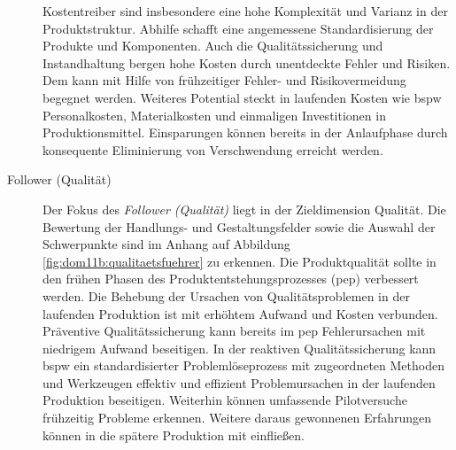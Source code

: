 \begin{description}
Kostentreiber sind insbesondere eine hohe Komplexität und Varianz in der Produktstruktur. Abhilfe schafft eine angemessene Standardisierung der Produkte und Komponenten. 
Auch die Qualitätssicherung und Instandhaltung bergen hohe Kosten durch unentdeckte Fehler und Risiken. Dem kann mit Hilfe von frühzeitiger Fehler- und Risikovermeidung begegnet werden. 
Weiteres Potential steckt in laufenden Kosten wie \gls{bspw} Personalkosten, Materialkosten und einmaligen Investitionen in Produktionsmittel. Einsparungen können bereits in der Anlaufphase durch konsequente Eliminierung von Verschwendung erreicht werden. 

\item[Follower (Qualität)] Der Fokus des \textit{Follower (Qualität)} liegt in der Zieldimension Qualität.
Die Bewertung der Handlungs- und Gestaltungsfelder sowie die Auswahl der Schwerpunkte sind im Anhang auf Abbildung \ref{fig:dom11b:qualitaetsfuehrer} zu erkennen. 
%
Die Produktqualität sollte in den frühen Phasen des Produktentstehungsprozesses (\gls{pep}) verbessert werden. Die Behebung der Ursachen von Qualitätsproblemen in der laufenden Produktion ist mit erhöhtem Aufwand und Kosten verbunden. Präventive Qualitätssicherung kann bereits im \gls{pep} Fehlerursachen mit niedrigem Aufwand beseitigen. 
In der reaktiven Qualitätssicherung kann \gls{bspw} ein standardisierter Problemlöseprozess mit zugeordneten Methoden und Werkzeugen effektiv und effizient Problemursachen in der laufenden Produktion beseitigen. 
Weiterhin können umfassende Pilotversuche frühzeitig Probleme erkennen. Weitere daraus gewonnenen Erfahrungen können in die spätere Produktion mit einfließen. 


\end{description}
